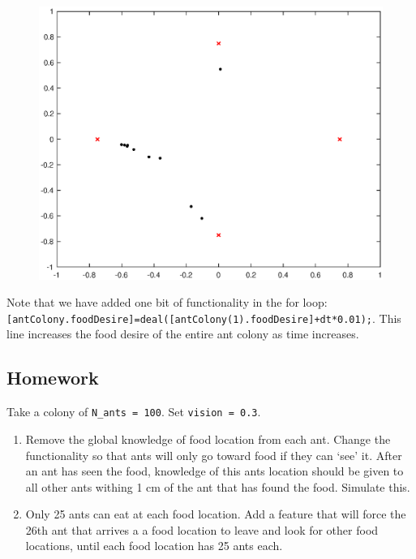 \documentclass[12pt]{article}
\begin{document}
\begin{figure}[H]
\centering
\includegraphics[width=0.75\linewidth]{antSim.eps}
\label{fig_movement_sim}
\end{figure}

Note that we have added one bit of functionality in the for loop: \lstinline|[antColony.foodDesire]=deal([antColony(1).foodDesire]+dt*0.01);|. This line increases the food desire of the entire ant colony as time increases. 

\subsection{Homework}
Take a colony of \lstinline|N_ants = 100|. Set \lstinline|vision = 0.3|.
\begin{enumerate}
\item Remove the global knowledge of food location from each ant. Change the functionality so that ants will only go toward food if they can `see' it. After an ant has seen the food, knowledge of this ants location should be given to all other ants withing 1 cm of the ant that has found the food. Simulate this. 
\item Only 25 ants can eat at each food location. Add a feature that will force the 26th ant that arrives a a food location to leave and look for other food locations, until each food location has 25 ants each. 
\end{enumerate} 

\printbibliography
\end{document}
